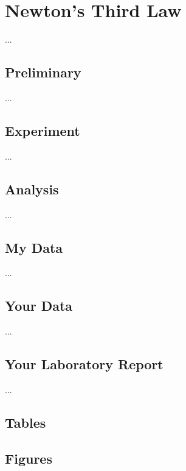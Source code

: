 \setcounter{chapter}{5}
\chapter{Newton's Third Law}
...
\section{Preliminary}
...
\section{Experiment}
...
\section{Analysis}
...
\section{My Data}
...
\section{Your Data}
...
\newpage
\section{Your Laboratory Report}
...
\newpage
\section{Tables}
\FloatBarrier
\newpage
\section{Figures}
